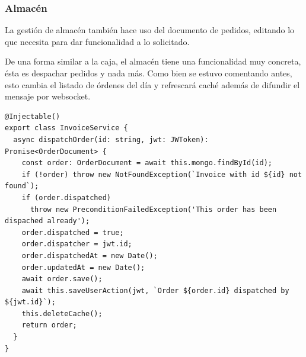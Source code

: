 \subsubsection{Almacén}
La gestión de almacén también hace uso del documento de pedidos, editando lo que necesita para dar funcionalidad a lo solicitado.
\vspace{1em}
\par De una forma similar a la caja, el almacén tiene una funcionalidad muy concreta, ésta es despachar pedidos y nada más. Como bien se estuvo comentando antes, esto cambia el listado de órdenes del día y refrescará caché además de difundir el mensaje por websocket.
\vspace{1em}
\par 
\begin{lstlisting}[caption={Invoice service: Despachar pedido},label=cod:service-invoice-dispatch-order]
@Injectable()
export class InvoiceService {
  async dispatchOrder(id: string, jwt: JWToken): Promise<OrderDocument> {
    const order: OrderDocument = await this.mongo.findById(id);
    if (!order) throw new NotFoundException(`Invoice with id ${id} not found`);
    if (order.dispatched)
      throw new PreconditionFailedException('This order has been dispached already');
    order.dispatched = true;
    order.dispatcher = jwt.id;
    order.dispatchedAt = new Date();
    order.updatedAt = new Date();
    await order.save();
    await this.saveUserAction(jwt, `Order ${order.id} dispatched by ${jwt.id}`);
    this.deleteCache();
    return order;
  }
}
\end{lstlisting}
\clearpage

